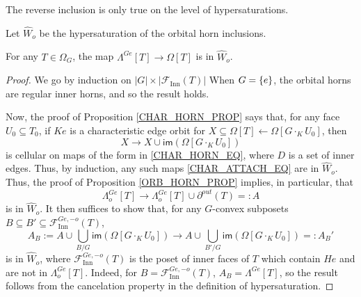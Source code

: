 \documentclass[a4paper,10p,draft]{article}%
\numberwithin{equation}{section}%
\begin{document}
The reverse inclusion is only true on the level of hypersaturations.
\begin{definition}
      Let $\hat{W}_o$ be the hypersaturation of the orbital horn inclusions.
\end{definition}

\begin{proposition}
      \label{HORN_ORB_PROP}
      For any $T \in \Omega_G$, the map
      $\Lambda^{G e}[T] \to \Omega[T]$
      is in $\hat{W}_o$.
\end{proposition}
\begin{proof}
      We go by induction on $|G| \times |\mathscr{F}_{\mathrm{Inn}}(T)|$ 
      When $G = \left\{e\right\}$, the orbital horns are regular inner horns, and so the result holds.

      Now, the proof of Proposition \ref{CHAR_HORN_PROP} says that,
      for any face $U_0 \subseteq T_0$,
      if $K e$ is a characteristic edge orbit for $X \subseteq \Omega[T] \leftarrow \Omega[G \cdot_K U_0]$, then
      \begin{equation}
            \label{CHAR_ATTACH_EQ}
            X \to X \cup \mathsf{im}\left(\Omega[G \cdot_K U_0]\right)
      \end{equation}
      is cellular on maps of the form in \eqref{CHAR_HORN_EQ}, where $D$ is a set of inner edges.
      Thus, by induction, any such maps \eqref{CHAR_ATTACH_EQ} are in $\hat{W}_o$.
      Thus, the proof of Proposition \ref{ORB_HORN_PROP} implies, in particular, that
      \begin{equation}
            \Lambda^{G e}_o[T] \to \Lambda^{G e}_o[T] \cup \partial^{out}(T) =: A
      \end{equation}
      is in $\hat{W}_o$.
      It then suffices to show that, for any $G$-convex subposets $B \subseteq B' \subseteq \mathscr{F}_{\mathrm{Inn}}^{G e,-o}(T)$,
      \begin{equation}
            \label{ORB_HORN_ATTACH_EQ}
            A_B := A \cup \mathop{\bigcup}\limits_{B/G}\mathsf{im}\left(\Omega[G \cdot_{K} U_0]\right)
            \to
            A \cup \mathop{\bigcup}\limits_{B'/G}\mathsf{im}\left(\Omega[G \cdot_{K} U_0]\right) =: A_B'
      \end{equation}
      is in $\hat{W}_o$,
      where $\mathscr{F}_{\mathrm{Inn}}^{G e,-o}(T)$ is the poset of inner faces of $T$ which contain $H e$ and are not in $\Lambda^{G e}_o[T]$.
      Indeed, for $B = \mathscr{F}_{\mathrm{Inn}}^{G e,-o}(T)$, $A_B = \Lambda^{G e}[T]$,
      so the result follows from the cancelation property in the definition of hypersaturation.


\end{proof}
\end{document}
